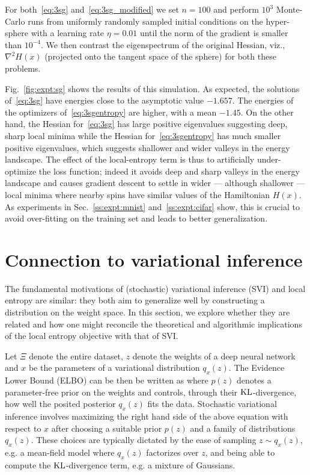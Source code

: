 \documentclass[10pt]{article}
\begin{document}
\begin{appendices}
{For both~\eqref{eq:3sg} and~\eqref{eq:3sg_modified} we set $n = 100$ and perform $10^3$ Monte-Carlo runs from uniformly randomly sampled initial conditions on the hyper-sphere with a learning rate $\eta = 0.01$ until the norm of the gradient is smaller than $10^{-4}$. We then contrast the eigenspectrum of the original Hessian, viz., $\nabla^2 H(x)$ (projected onto the tangent space of the sphere) for both these problems.

Fig.~\ref{fig:expt:sg} shows the results of this simulation. As expected, the solutions of~\eqref{eq:3sg} have energies close to the asymptotic value $-1.657$. The energies of the optimizers of~\eqref{eq:3sgentropy} are higher, with a mean $-1.45$. On the other hand, the Hessian for~\eqref{eq:3sg} has large positive eigenvalues suggesting deep, sharp local minima while the Hessian for~\eqref{eq:3sgentropy} has much smaller positive eigenvalues, which suggests shallower and wider valleys in the energy landscape. The effect of the local-entropy term is thus to artificially under-optimize the loss function; indeed it avoids deep and sharp valleys in the energy landscape and causes gradient descent to settle in wider --- although shallower --- local minima where nearby spins have similar values of the Hamiltonian $H(x)$. As experiments in Sec.~\ref{ss:expt:mnist} and~\ref{ss:expt:cifar} show, this is crucial to avoid over-fitting on the training set and leads to better generalization.
}

\section{Connection to variational inference}
\label{s:app:connection_variational}

\newcommand{\kl}{\trm{KL}}
The fundamental motivations of (stochastic) variational inference (SVI) and local entropy are similar: they both aim to generalize well by constructing a distribution on the weight space. In this section, we explore whether they are related and how one might reconcile the theoretical and algorithmic implications of the local entropy objective with that of SVI.

Let $\Xi$ denote the entire dataset, $z$ denote the weights of a deep neural network and $x$ be the parameters of a variational distribution $q_x(z)$. The Evidence Lower Bound (ELBO) can be then be written as
\beq{
    \log p(\Xi) \geq \E_{z \sim q_x(z)}\ \sqbrac{\log p(\Xi\ |\ z)} - \kl \rbrac{q_x(z)\ ||\ p(z)};
    \label{eq:elbo}
}
where $p(z)$ denotes a parameter-free prior on the weights and controls, through their $\kl$-divergence, how well the posited posterior $q_x(z)$ fits the data. Stochastic variational inference involves maximizing the right hand side of the above equation with respect to $x$ after choosing a suitable prior $p(z)$ and a family of distributions $q_x(z)$. These choices are typically dictated by the ease of sampling $z \sim q_x(z)$, e.g. a mean-field model where $q_x(z)$ factorizes over $z$, and being able to compute the $\kl$-divergence term, e.g. a mixture of Gaussians.


\end{appendices}
\end{document}
